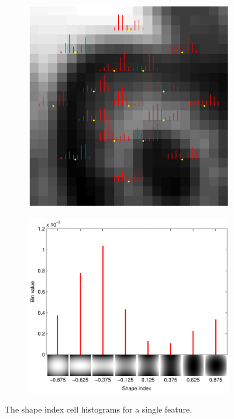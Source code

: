 \documentclass[thesis.tex]{subfiles}
\begin{document}
\begin{figure}[p]
   	\centering
	\begin{subfigure}[t]{0.65\textwidth}
	    \includegraphics[width=\textwidth]{img/cellHistFigureSi.pdf}
    \end{subfigure}
    \begin{subfigure}[t]{0.65\textwidth}
    	\centering
    	\includegraphics[width=\textwidth]{img/cellHistFigureSiExample.pdf}
   	\end{subfigure}
   	\caption{The shape index cell histograms for a single feature.}
    \label{fig:cellHistFigureSiC}
\end{figure}
%
\subbibliography
\end{document}
